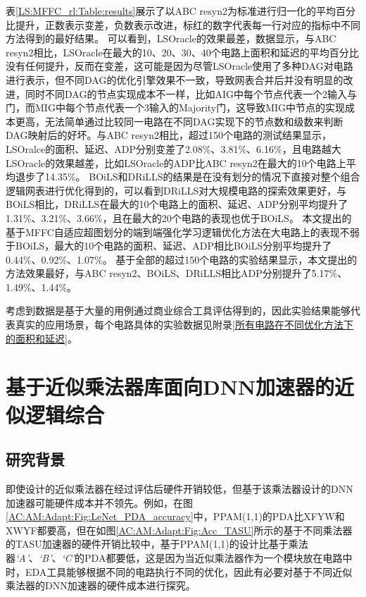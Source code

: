 表\ref{LS:MFFC_rl:Table:results}展示了以ABC resyn2为标准进行归一化的平均百分比提升，正数表示变差，负数表示改进，标红的数字代表每一行对应的指标中不同方法得到的最好结果。
可以看到，LSOracle\cite{LS:LSOracle}的效果最差，数据显示，与ABC resyn2相比，LSOracle在最大的10、20、30、40个电路上面积和延迟的平均百分比没有任何提升，反而在变差，这可能是因为尽管LSOracle使用了多种DAG对电路进行表示，但不同DAG的优化引擎效果不一致，导致网表合并后并没有明显的改进，同时不同DAG的节点实现成本不一样，比如AIG中每个节点代表一个2输入与门，而MIG中每个节点代表一个3输入的Majority门，这导致MIG中节点的实现成本更高，无法简单通过比较同一电路在不同DAG实现下的节点数和级数来判断DAG映射后的好坏。与ABC resyn2相比，超过150个电路的测试结果显示，LSOralce的面积、延迟、ADP分别变差了2.08\%、3.81\%、6.16\%，且电路越大LSOracle的效果越差，比如LSOracle的ADP比ABC resyn2在最大的10个电路上平均退步了14.35\%。
BOiLS和DRiLLS的结果是在没有划分的情况下直接对整个组合逻辑网表进行优化得到的，可以看到DRiLLS对大规模电路的探索效果更好，与BOiLS相比，DRiLLS在最大的10个电路上的面积、延迟、ADP分别平均提升了1.31\%、3.21\%、3.66\%，且在最大的20个电路的表现也优于BOiLS。
本文提出的基于MFFC自适应超图划分的端到端强化学习逻辑优化方法在大电路上的表现不弱于BOiLS，最大的10个电路的面积、延迟、ADP相比BOiLS分别平均提升了0.44\%、0.92\%、1.07\%。
基于全部的超过150个电路的实验结果显示，本文提出的方法效果最好，与ABC resyn2、BOiLS、DRiLLS相比ADP分别提升了5.17\%、1.49\%、1.44\%。

考虑到数据是基于大量的用例通过商业综合工具评估得到的，因此实验结果能够代表真实的应用场景，每个电路具体的实验数据见附录\ref{所有电路在不同优化方法下的面积和延迟}。


\section{基于近似乘法器库面向DNN加速器的近似逻辑综合}

\subsection{研究背景}

即使设计的近似乘法器在经过评估后硬件开销较低，但基于该乘法器设计的DNN加速器可能硬件成本并不领先。例如，在图\ref{AC:AM:Adapt:Fig:LeNet_PDA_accuracy}中，PPAM(1,1)的PDA比XFYW和XWYF都要高，但在如图\ref{AC:AM:Adapt:Fig:Acc_TASU}所示的基于不同乘法器的TASU加速器的\cite{Accelerator:JiaoLi}硬件开销比较中，基于PPAM(1,1)的设计比基于乘法器\emph{`A'}、\emph{`B'}、\emph{`C'}的PDA都要低，这是因为当近似乘法器作为一个模块放在电路中时，EDA工具能够根据不同的电路执行不同的优化，因此有必要对基于不同近似乘法器的DNN加速器的硬件成本进行探究。

